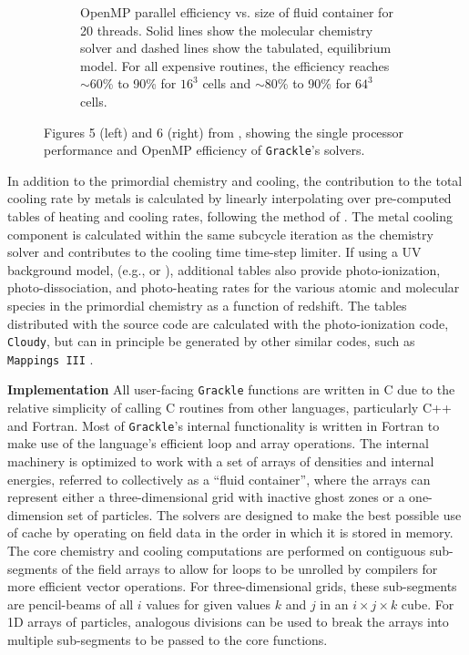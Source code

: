 \documentclass[11pt]{article}
\newcommand{\grackle}{\texttt{Grackle}}
\begin{document}
\begin{flushleft}
\begin{figure}[h]
\begin{subfigure}{.42\textwidth}
  \caption{OpenMP parallel efficiency vs. size of fluid container for
    20 threads.  Solid lines show the molecular
    chemistry solver and dashed lines show the tabulated, equilibrium
    model.  For all expensive routines, the efficiency reaches
    $\sim$60\% to 90\% for $16^3$ cells and $\sim$80\% to 90\% for
    $64^3$ cells.}
  \label{fig:openmp}
\end{subfigure}%
\caption{Figures 5 (left) and 6 (right) from
  \citet{2017MNRAS.466.2217S}, showing the single processor
  performance and OpenMP efficiency of \grackle{}'s solvers.}
\label{fig:performance}
\vspace*{-1\baselineskip}
\end{figure}

In addition to the primordial chemistry and cooling, the contribution
to the total cooling rate by metals is calculated by linearly
interpolating over pre-computed tables of heating and cooling rates,
following the method of \citet{2008MNRAS.385.1443S}.
The metal cooling component is calculated within the same subcycle
iteration as the chemistry solver and contributes to the cooling time
time-step limiter.
If using a UV background model, (e.g.,
\citet{2009ApJ...703.1416F} or \citet{2012ApJ...746..125H}),
additional tables also provide photo-ionization, photo-dissociation,
and photo-heating rates for the various atomic and molecular species
in the primordial chemistry as a function of redshift.
The tables distributed with the source code are calculated with the
photo-ionization code, \texttt{Cloudy}, but can in principle be
generated by other similar codes, such as \texttt{Mappings III}
\citep{1993ApJS...88..253S}.

\noindent
{\bf Implementation}
All user-facing \grackle{} functions are written in C due
to the relative simplicity of calling C routines from other
languages, particularly C++ and Fortran.  Most of \grackle{}'s
internal functionality is written in Fortran to make use of the
language's efficient loop and array operations.
The internal machinery is optimized to work with a set of arrays of
densities and internal energies, referred to collectively as a ``fluid
container'', where the arrays can represent either a three-dimensional
grid with inactive ghost zones or a one-dimension set of particles.
The solvers are designed to make the best possible use of cache by
operating on field data in the order in which it is stored in memory.
The core chemistry and cooling computations are performed on
contiguous sub-segments of the field arrays to allow for loops to be
unrolled by compilers for more efficient vector operations.  For
three-dimensional grids, these sub-segments are pencil-beams of all $i$
values for given values $k$ and $j$ in an $i\times j\times k$ cube.
For 1D arrays of particles, analogous divisions can be used to break
the arrays into multiple sub-segments to be passed to the core
functions.


\end{flushleft}
\end{document}
